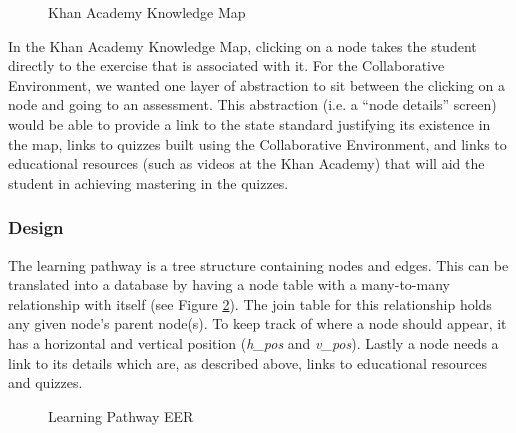 \begin{figure}[h!]
	\centering
	\caption{Khan Academy Knowledge Map}
	\label{fig:screens-pathway-khan-map}
\end{figure}

In the Khan Academy Knowledge Map, clicking on a node takes the student directly to the exercise that is associated with it. For the Collaborative Environment, we wanted one layer of abstraction to sit between the clicking on a node and going to an assessment. This abstraction (i.e. a ``node details'' screen) would be able to provide a link to the state standard justifying its existence in the map, links to quizzes built using the Collaborative Environment, and links to educational resources (such as videos at the Khan Academy) that will aid the student in achieving mastering in the quizzes.

\subsubsection{Design}
The learning pathway is a tree structure containing nodes and edges. This can be translated into a database by having a node table with a many-to-many relationship with itself (see Figure \ref{fig:er-pathway}). The join table for this relationship holds any given node's parent node(s). To keep track of where a node should appear, it has a horizontal and vertical position (\emph{h\_pos} and \emph{v\_pos}). Lastly a node needs a link to its details which are, as described above, links to educational resources and quizzes.
\begin{figure}[h!]
	\centering
	\caption{Learning Pathway EER}
	\label{fig:er-pathway}
\end{figure}

